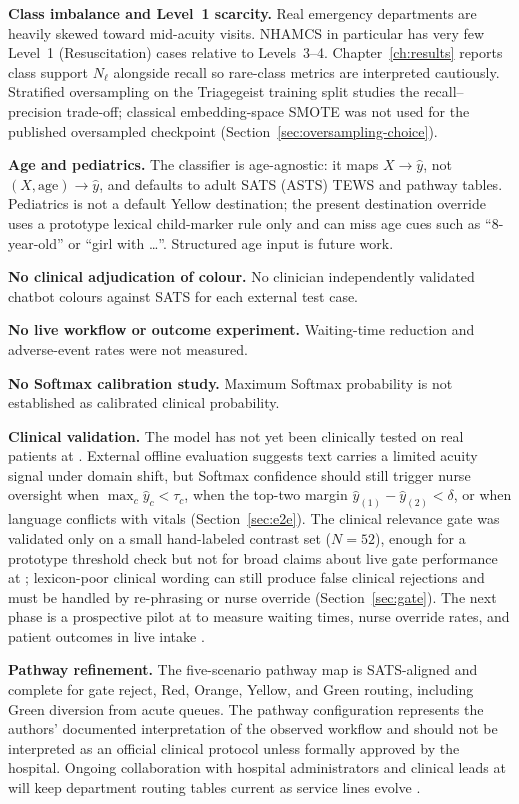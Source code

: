 \textbf{Class imbalance and Level~1 scarcity.} Real emergency departments are heavily skewed toward mid-acuity visits. NHAMCS in particular has very few Level~1 (Resuscitation) cases relative to Levels~3--4. Chapter~\ref{ch:results} reports class support \(N_\ell\) alongside recall so rare-class metrics are interpreted cautiously. Stratified oversampling on the Triagegeist training split studies the recall--precision trade-off; classical embedding-space SMOTE was not used for the published oversampled checkpoint (Section~\ref{sec:oversampling-choice}).

\textbf{Age and pediatrics.} The classifier is age-agnostic: it maps \(X\to\hat{y}\), not \((X,\mathrm{age})\to\hat{y}\), and defaults to adult SATS (ASTS) TEWS and pathway tables. Pediatrics is not a default Yellow destination; the present destination override uses a prototype lexical child-marker rule only and can miss age cues such as ``8-year-old'' or ``girl with \ldots''. Structured age input is future work.

\textbf{No clinical adjudication of colour.} No clinician independently validated chatbot colours against SATS for each external test case.

\textbf{No live workflow or outcome experiment.} Waiting-time reduction and adverse-event rates were not measured.

\textbf{No Softmax calibration study.} Maximum Softmax probability is not established as calibrated clinical probability.

\textbf{Clinical validation.} The model has not yet been clinically tested on real patients at \examplehospital{}. External offline evaluation suggests text carries a limited acuity signal under domain shift, but Softmax confidence should still trigger nurse oversight when \(\max_c\hat{y}_c < \tau_c\), when the top-two margin \(\hat{y}_{(1)}-\hat{y}_{(2)} < \delta\), or when language conflicts with vitals (Section~\ref{sec:e2e}). The clinical relevance gate was validated only on a small hand-labeled contrast set (\(N=52\)), enough for a prototype threshold check but not for broad claims about live gate performance at \examplehospital{}; lexicon-poor clinical wording can still produce false clinical rejections and must be handled by re-phrasing or nurse override (Section~\ref{sec:gate}). The next phase is a prospective pilot at \examplehospital{} to measure waiting times, nurse override rates, and patient outcomes in live intake \citep{Mitchell2023}.

\textbf{Pathway refinement.} The five-scenario pathway map is SATS-aligned and complete for gate reject, Red, Orange, Yellow, and Green routing, including Green diversion from acute queues. The pathway configuration represents the authors' documented interpretation of the observed workflow and should not be interpreted as an official clinical protocol unless formally approved by the hospital. Ongoing collaboration with hospital administrators and clinical leads at \examplehospital{} will keep department routing tables current as service lines evolve \citep{Rominski2014,satsmanual}.

